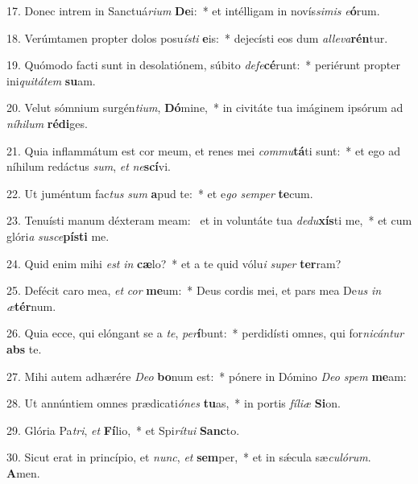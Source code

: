17. Donec intrem in Sanctuá\textit{ri}\textit{um} \textbf{De}i:~*  et intélligam in novís\textit{si}\textit{mis} \textit{e}\textbf{ó}rum.\

18. Verúmtamen propter dolos posu\textit{ís}\textit{ti} \textbf{e}is:~*  dejecísti eos dum \textit{al}\textit{le}\textit{va}\textbf{rén}tur.\

19. Quómodo facti sunt in desolatiónem, súbito \textit{de}\textit{fe}\textbf{cé}runt:~*  periérunt propter ini\textit{qui}\textit{tá}\textit{tem} \textbf{su}am.\

20. Velut sómnium surgén\textit{ti}\textit{um}, \textbf{Dó}mine,~*  in civitáte tua imáginem ipsórum ad \textit{ní}\textit{hi}\textit{lum} \textbf{réd}\textbf{i}ges.\

21. Quia inflammátum est cor meum, et renes mei \textit{com}\textit{mu}\textbf{tá}ti sunt:~*  et ego ad níhilum redáctus \textit{sum}, \textit{et} \textit{ne}\textbf{scí}vi.\

22. Ut juméntum fac\textit{tus} \textit{sum} \textbf{a}pud te:~*  et e\textit{go} \textit{sem}\textit{per} \textbf{te}cum.\

23. Tenuísti manum déxteram meam: \dag\  et in voluntáte tua \textit{de}\textit{du}\textbf{xís}ti me,~*  et cum glóri\textit{a} \textit{su}\textit{sce}\textbf{pís}\textbf{ti} me.\

24. Quid enim mihi \textit{est} \textit{in} \textbf{cæ}lo?~*  et a te quid vólu\textit{i} \textit{su}\textit{per} \textbf{ter}ram?\

25. Defécit caro mea, \textit{et} \textit{cor} \textbf{me}um:~*  Deus cordis mei, et pars mea De\textit{us} \textit{in} \textit{æ}\textbf{tér}num.\

26. Quia ecce, qui elóngant se a \textit{te}, \textit{per}\textbf{í}bunt:~*  perdidísti omnes, qui for\textit{ni}\textit{cán}\textit{tur} \textbf{abs} te.\

27. Mihi autem adhærére \textit{De}\textit{o} \textbf{bo}num est:~*  pónere in Dómino \textit{De}\textit{o} \textit{spem} \textbf{me}am:\

28. Ut annúntiem omnes prædicati\textit{ó}\textit{nes} \textbf{tu}as,~*  in portis \textit{fí}\textit{li}\textit{æ} \textbf{Si}on.\

29. Glória Pa\textit{tri}, \textit{et} \textbf{Fí}lio,~*  et Spi\textit{rí}\textit{tu}\textit{i} \textbf{Sanc}to.\

30. Sicut erat in princípio, et \textit{nunc}, \textit{et} \textbf{sem}per,~*  et in sǽcula sæ\textit{cu}\textit{ló}\textit{rum}. \textbf{A}men.\

